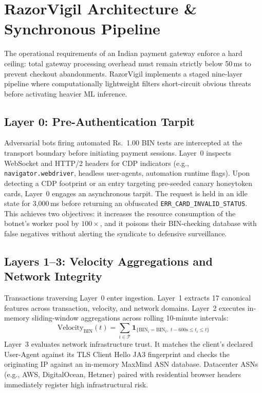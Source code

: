 \documentclass[conference]{IEEEtran}
\begin{document}
\section{RazorVigil Architecture \& Synchronous Pipeline}
\label{sec:arch}

The operational requirements of an Indian payment gateway enforce a hard ceiling: total gateway processing overhead must remain strictly below 50\,ms to prevent checkout abandonments. RazorVigil implements a staged nine-layer pipeline where computationally lightweight filters short-circuit obvious threats before activating heavier ML inference.

\subsection{Layer 0: Pre-Authentication Tarpit}
Adversarial bots firing automated Rs.~1.00 BIN tests are intercepted at the transport boundary before initiating payment sessions. Layer~0 inspects WebSocket and HTTP/2 headers for CDP indicators (e.g., \texttt{navigator.webdriver}, headless user-agents, automation runtime flags). Upon detecting a CDP footprint or an entry targeting pre-seeded canary honeytoken cards, Layer~0 engages an asynchronous tarpit. The request is held in an idle state for 3,000\,ms before returning an obfuscated \texttt{ERR\_CARD\_INVALID\_STATUS}. This achieves two objectives: it increases the resource consumption of the botnet's worker pool by $100\times$, and it poisons their BIN-checking database with false negatives without alerting the syndicate to defensive surveillance.

\subsection{Layers 1--3: Velocity Aggregations and Network Integrity}
Transactions traversing Layer~0 enter ingestion. Layer~1 extracts 17 canonical features across transaction, velocity, and network domains. Layer~2 executes in-memory sliding-window aggregations across rolling 10-minute intervals:
\begin{equation}
    \text{Velocity}_{\text{BIN}}(t) = \sum_{i \in \mathcal{T}} \mathbf{1}_{\{\text{BIN}_i = \text{BIN}_t,\; t - 600\text{s} \le t_i \le t\}}
\end{equation}
Layer~3 evaluates network infrastructure trust. It matches the client's declared User-Agent against its TLS Client Hello JA3 fingerprint and checks the originating IP against an in-memory MaxMind ASN database. Datacenter ASNs (e.g., AWS, DigitalOcean, Hetzner) paired with residential browser headers immediately register high infrastructural risk.
\end{document}
